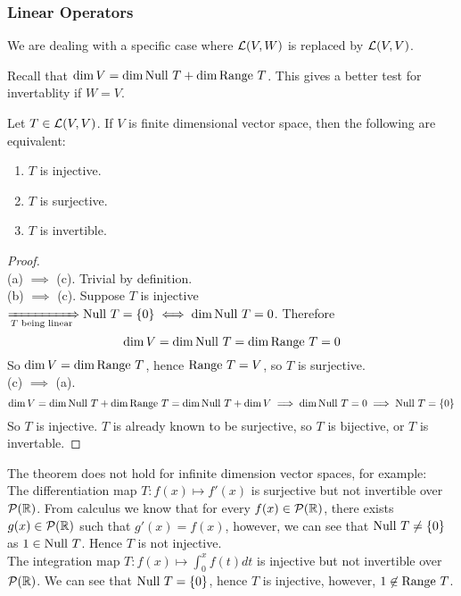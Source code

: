\subsubsection{Linear Operators}
We are dealing with a specific case where $\mathcal L(V,W)$ is replaced by $\mathcal L(V,V)$.
\begin{center}
\end{center}
Recall that $\dim V = \dim \text{Null } T + \dim \text{Range } T$. This gives a better test for invertablity if $W  = V$. 
\begin{theorem}
    Let $T \in \mathcal L(V,V)$. If $V$ is finite dimensional vector space, then the following are equivalent: 
    \begin{enumerate}[label = (\alph*)]
        \item $T$ is injective.
        \item $T$ is surjective.
        \item $T$ is invertible.
    \end{enumerate}
\end{theorem}
\begin{proof} $ $ \\
    (a) $\implies$ (c). Trivial by definition. \\
    (b) $\implies$ (c). Suppose $T$ is injective $\xRightarrow[T \text{ being linear}]{} \text{Null } T = \left\{ 0 \right\} \iff \dim \text{Null } T = 0$. Therefore 
    \[ \dim V = \dim \text{Null } T = \dim \text{Range } T = 0\] So $\dim V = \dim \text{Range } T$, hence $\text{Range } T = V$, so $T$ is surjective. \\
    (c) $\implies$ (a).  \[\dim V = \dim \text{Null } T + \dim \text{Range } T = \dim \text{Null } T + \dim V \implies \dim \text{Null } T  = 0 \implies \text{Null } T = \left\{ 0\right\}\] So $T$ is injective. $T$ is already known to be surjective, so $T$ is bijective, or $T$ is invertable.
\end{proof}
\begin{example}
    The theorem does not hold for infinite dimension vector spaces, for example: \\ 
    The differentiation map $T : f(x) \mapsto f'(x)$ is surjective but not invertible over $\mathcal P(\mathbb R)$.  From calculus we know that for every $f(x) \in \mathcal P(\mathbb R)$, there exists $g(x) \in \mathcal P(\mathbb R)$ such that $g'(x) = f(x)$, however, we can see that $\text{Null } T \neq \left\{ 0 \right\}$ as $1 \in
    \text{Null } T$. Hence $T$ is not injective. \\
    The integration map $\displaystyle T: f(x) \mapsto \int_0^x f(t) dt$ is injective but not invertible over $\mathcal P(\mathbb R)$. We can see that $\text{Null } T = \left\{ 0 \right\}$, hence $T$ is injective, however, $1 \not\in \text{Range } T$.
\end{example}
